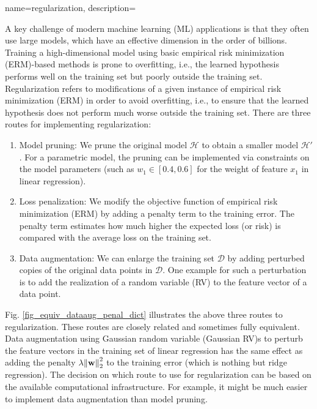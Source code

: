 {
{name={regularization}, 
	description={A key challenge of modern machine learning (ML) applications is that they often 
		use large models, which have an effective dimension in the order of billions. 
		Training a high-dimensional model using basic empirical risk minimization (ERM)-based methods
		is prone to overfitting, i.e., the learned hypothesis performs well on the training set 
		but poorly outside the training set. Regularization refers to modifications of a given instance 
		of empirical risk minimization (ERM) in order to avoid overfitting, i.e., to ensure that the learned hypothesis does 
		not perform much worse outside the training set. There are three routes for implementing 
		regularization: 
		\begin{enumerate}[label=\arabic*)]
			\item {Model pruning:} We prune the original model $\mathcal{H}$ to obtain a 
			smaller model $\mathcal{H}'$. For a parametric model, the pruning can be 
			implemented via constraints on the model parameters (such as $w_{1} \in [0.4,0.6]$ for 
			the weight of feature $x_{1}$ in linear regression).
			\item {Loss penalization:} We modify the objective function of empirical risk minimization (ERM) by adding a 
			penalty term to the training error. The penalty term estimates how much higher the expected loss (or risk) 
			is compared with the average loss on the training set. 
			\item {Data augmentation:} We can enlarge the training set $\mathcal{D}$ by adding 
			perturbed copies of the original data points in $\mathcal{D}$. One example for such 
			a perturbation is to add the realization of a random variable (RV) to the feature vector 
			of a data point. 
		\end{enumerate} 
		Fig. \ref{fig_equiv_dataaug_penal_dict} illustrates the above three routes to regularization. 
		These routes are closely related and sometimes fully equivalent. Data augmentation using Gaussian random variable (Gaussian RV)s 
		to perturb the feature vectors in the training set of linear regression 
		has the same effect as adding the penalty 
		$\lambda \mleft\lVert {\bf w} \mright\rVert_{2}^2$ to the training error (which is nothing but ridge regression). 
        		The decision on which route to use for regularization can be based on the 
        		available computational infrastructure. For example, it might be much easier to 
        		implement data augmentation than model pruning. 
		\begin{figure}[H]
			\begin{center} 
				\begin{tikzpicture}[scale = 1]
					

\end{tikzpicture}
\end{center}
\end{figure}}}}
